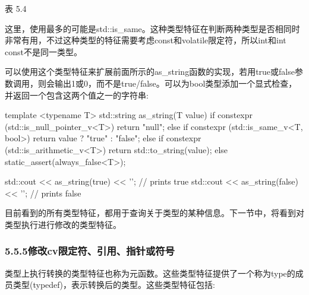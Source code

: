 \begin{center}
表 5.4
\end{center}

这里，使用最多的可能是std::is\_same。这种类型特征在判断两种类型是否相同时非常有用，不过这种类型的特征需要考虑const和volatile限定符，所以int和int const不是同一类型。

可以使用这个类型特征来扩展前面所示的as\_string函数的实现，若用true或false参数调用，则会输出1或0，而不是true/false。可以为bool类型添加一个显式检查，并返回一个包含这两个值之一的字符串:

\begin{cpp}
template <typename T>
std::string as_string(T value)
{
	if constexpr (std::is_null_pointer_v<T>)
		return "null";
	else if constexpr (std::is_same_v<T, bool>)
		return value ? "true" : "false";
	else if constexpr (std::is_arithmetic_v<T>)
		return std::to_string(value);
	else
		static_assert(always_false<T>);
}

std::cout << as_string(true) << '\n'; // prints true
std::cout << as_string(false) << '\n'; // prints false
\end{cpp}

目前看到的所有类型特征，都用于查询关于类型的某种信息。下一节中，将看到对类型执行进行修改的类型特征。

\subsubsection{5.5.5\hspace{0.2cm}修改cv限定符、引用、指针或符号}

类型上执行转换的类型特征也称为元函数。这些类型特征提供了一个称为type的成员类型(typedef)，表示转换后的类型。这些类型特征包括:

